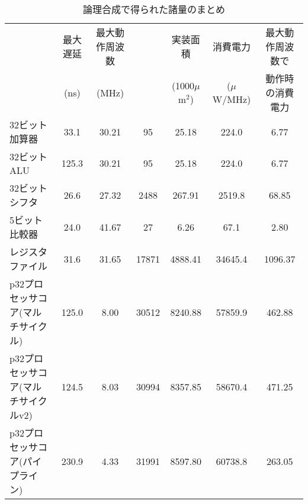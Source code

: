 \documentclass{jarticle}[11pt]
\newcommand{\lw}[1]{\smash{\lower2.ex\hbox{#1}}}
\begin{document}
\begin{table}[htb]

\caption{論理合成で得られた諸量のまとめ}
\label{tab:論理合成で得られた諸量のまとめ}
\begin{center}
{\tiny
\begin{tabular}{l|cccccc}
\hline
\hline
\lw{モジュール}
& 最大遅延 & 最大動作周波数 & \lw{ゲート数} & 実装面積 & 消費電力 &
最大動作周波数で \\
& (ns) & (MHz) & & (1000$\mu$m$^2$) & ($\mu$W/MHz) & 動作時の消費電力 \\
\hline
32ビット加算器     &33.1 &30.21& 95& 25.18& 224.0& 6.77 \\
32ビットALU    & 125.3& 30.21& 95& 25.18& 224.0& 6.77\\
32ビットシフタ     & 26.6& 27.32& 2488& 267.91& 2519.8& 68.85\\
5ビット比較器     & 24.0& 41.67& 27& 6.26& 67.1& 2.80\\
レジスタファイル     & 31.6& 31.65& 17871& 4888.41& 34645.4& 1096.37\\
p32プロセッサコア(マルチサイクル)   & 125.0& 8.00& 30512& 8240.88& 57859.9& 462.88\\
p32プロセッサコア(マルチサイクルv2)   & 124.5& 8.03& 30994& 8357.85& 58670.4& 471.25\\
p32プロセッサコア(パイプライン)   & 230.9& 4.33& 31991& 8597.80& 60738.8& 263.05\\
\hline
\end{tabular}
}
\end{center}
\end{table}


\end{document}
